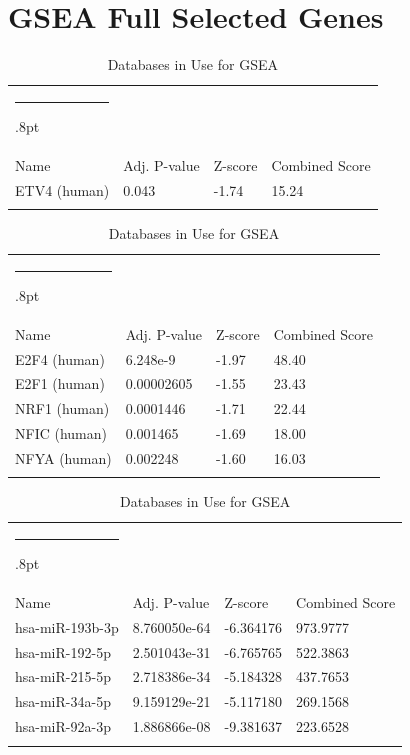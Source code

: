 \documentclass[3p,authoryear,preprint,12pt]{elsarticle}
\makeatletter
\def\hlinewd#1{%
  \noalign{\ifnum0=`}\fi\hrule \@height #1%
  \futurelet\reserved@a\@xhline}
\def\tbltoprule{\hlinewd{.8pt}\\[-12pt]}
\def\tblbottomrule{\noalign{\vspace*{6pt}}\hline\noalign{\vspace*{2pt}}}
\def\tblmidrule{\noalign{\vspace*{6pt}}\hline\noalign{\vspace*{2pt}}}
\makeatother
\begin{document}
\section{GSEA Full Selected Genes}\label{appendix-title-fe590e9f8eaf}
\begin{table}[!htbp]
	\caption{{Databases in Use for GSEA} }
	\label{tw-de478ae31cc6}
	\def\arraystretch{1}
	\ignorespaces 
	\centering 
	\begin{tabulary}{\linewidth}{p{\dimexpr.65\tabcolsep}p{\dimexpr.15\tabcolsep}p{\dimexpr.1\tabcolsep}p{\dimexpr.1\tabcolsep}}
		\tbltoprule Name & Adj. P-value & Z-score & Combined Score\\
		\tblmidrule 
ETV4 (human) & 0.043 & -1.74 & 15.24  \\
		\tblbottomrule
	\end{tabulary}\par 
\end{table}
\begin{table}[!htbp]
	\caption{{Databases in Use for GSEA} }
	\label{tw-de478ae31cc6}
	\def\arraystretch{1}
	\ignorespaces 
	\centering 
	\begin{tabulary}{\linewidth}{p{\dimexpr.65\tabcolsep}p{\dimexpr.15\tabcolsep}p{\dimexpr.1\tabcolsep}p{\dimexpr.1\tabcolsep}}
		\tbltoprule Name & Adj. P-value & Z-score & Combined Score\\
		\tblmidrule 
E2F4 (human) & 6.248e-9 & -1.97 & 48.40 \\
E2F1 (human) & 0.00002605 & -1.55 & 23.43 \\
NRF1 (human) & 0.0001446 & -1.71 & 22.44 \\
NFIC (human) & 0.001465 & -1.69 & 18.00 \\
NFYA (human) & 0.002248 & -1.60 & 16.03 \\
		\tblbottomrule
	\end{tabulary}\par 
\end{table}
\begin{table}[!htbp]
	\caption{{Databases in Use for GSEA} }
	\label{tw-de478ae31cc6}
	\def\arraystretch{1}
	\ignorespaces 
	\centering 
	\begin{tabulary}{\linewidth}{p{\dimexpr.65\tabcolsep}p{\dimexpr.15\tabcolsep}p{\dimexpr.1\tabcolsep}p{\dimexpr.1\tabcolsep}}
		\tbltoprule Name & Adj. P-value & Z-score & Combined Score\\
		\tblmidrule
hsa-miR-193b-3p & 8.760050e-64 & -6.364176 & 973.9777 \\
hsa-miR-192-5p & 2.501043e-31 & -6.765765 & 522.3863 \\
hsa-miR-215-5p & 2.718386e-34 & -5.184328 & 437.7653 \\
hsa-miR-34a-5p & 9.159129e-21 & -5.117180 & 269.1568 \\
hsa-miR-92a-3p & 1.886866e-08 & -9.381637 & 223.6528 \\
		\tblbottomrule
	\end{tabulary}\par 
\end{table}
\end{document}
